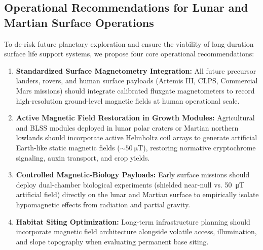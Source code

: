 \subsection{Operational Recommendations for Lunar and Martian Surface Operations}
To de-risk future planetary exploration and ensure the viability of long-duration surface life support systems, we propose four core operational recommendations:
\begin{enumerate}
    \item \textbf{Standardized Surface Magnetometry Integration:} All future precursor landers, rovers, and human surface payloads (Artemis III, CLPS, Commercial Mars missions) should integrate calibrated fluxgate magnetometers to record high-resolution ground-level magnetic fields at human operational scale.
    \item \textbf{Active Magnetic Field Restoration in Growth Modules:} Agricultural and BLSS modules deployed in lunar polar craters or Martian northern lowlands should incorporate active Helmholtz coil arrays to generate artificial Earth-like static magnetic fields ($\sim\SI{50}{\micro\tesla}$), restoring normative cryptochrome signaling, auxin transport, and crop yields.
    \item \textbf{Controlled Magnetic-Biology Payloads:} Early surface missions should deploy dual-chamber biological experiments (shielded near-null vs. \SI{50}{\micro\tesla} artificial field) directly on the lunar and Martian surface to empirically isolate hypomagnetic effects from radiation and partial gravity.
    \item \textbf{Habitat Siting Optimization:} Long-term infrastructure planning should incorporate magnetic field architecture alongside volatile access, illumination, and slope topography when evaluating permanent base siting.
\end{enumerate}

